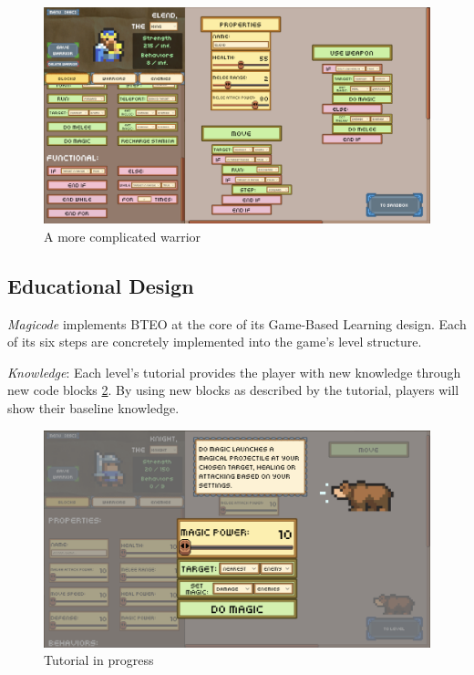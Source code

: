 \documentclass[10pt,twocolumn]{article}
\begin{document}
\begin{figure}
    \centering
    \includegraphics[width=\linewidth]{images/screenshots/elend_editor.png}
    \caption{A more complicated warrior}
    \label{fig:sandbox-warrior-screenshot}
\end{figure}


\subsection{Educational Design}
\textit{Magicode} implements BTEO at the core of its Game-Based Learning design. Each of its six steps are concretely implemented into the game’s level structure.

\textit{Knowledge}: Each level’s tutorial provides the player with new knowledge through new code blocks \ref{fig:tutorial-screenshot}. By using new blocks as described by the tutorial, players will show their baseline knowledge.

\begin{figure}     
    \centering
    \includegraphics[width=\linewidth]{images/screenshots/tutorial.png}
    \caption{Tutorial in progress}
    \label{fig:tutorial-screenshot}
\end{figure}
\end{document}
